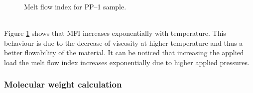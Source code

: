 \documentclass[a4paper, 11pt]{article}
\begin{document}
\begin{figure}[h!]
	\centering
	 \quad
	\captionsetup{justification=centering}
	\caption{Melt flow index for PP–1 sample.}
	\label{fig:mfi}
\end{figure}\\
Figure \ref{fig:mfi} shows that MFI increases exponentially with temperature. This behaviour is due to the decrease of viscosity at higher temperature and thus a better flowability of the material. It can be noticed that increasing the applied load the melt flow index increases exponentially due to higher applied pressures.

\newpage

\subsubsection{Molecular weight calculation}
\end{document}
